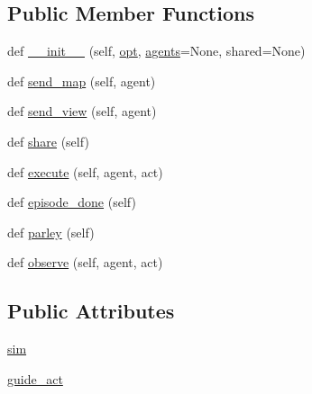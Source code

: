 \subsection*{Public Member Functions}
\begin{DoxyCompactItemize}
\item 
def \hyperlink{classparlai_1_1tasks_1_1talkthewalk_1_1worlds_1_1SimulateWorld_ab9073698c5054aaa0a605c946275cce4}{\+\_\+\+\_\+init\+\_\+\+\_\+} (self, \hyperlink{classparlai_1_1core_1_1worlds_1_1World_a3640d92718acd3e6942a28c1ab3678bd}{opt}, \hyperlink{classparlai_1_1core_1_1worlds_1_1MultiAgentDialogWorld_a05fc93525cb86edef121980fc55f9926}{agents}=None, shared=None)
\item 
def \hyperlink{classparlai_1_1tasks_1_1talkthewalk_1_1worlds_1_1SimulateWorld_aaf801dc51b7f37b6fb9629194ca4b2ee}{send\+\_\+map} (self, agent)
\item 
def \hyperlink{classparlai_1_1tasks_1_1talkthewalk_1_1worlds_1_1SimulateWorld_a6198679191b1f38d9c503372c99a8879}{send\+\_\+view} (self, agent)
\item 
def \hyperlink{classparlai_1_1tasks_1_1talkthewalk_1_1worlds_1_1SimulateWorld_ab11f69df41dbfe8552855eef15902a95}{share} (self)
\item 
def \hyperlink{classparlai_1_1tasks_1_1talkthewalk_1_1worlds_1_1SimulateWorld_ab3c47cd21114eb9b4d043f76d2a387e7}{execute} (self, agent, act)
\item 
def \hyperlink{classparlai_1_1tasks_1_1talkthewalk_1_1worlds_1_1SimulateWorld_a617e95ecc8ed3dd19c3cc391c4129b42}{episode\+\_\+done} (self)
\item 
def \hyperlink{classparlai_1_1tasks_1_1talkthewalk_1_1worlds_1_1SimulateWorld_a6bd5a8a8e194dd4aa76aeecdf429bc7f}{parley} (self)
\item 
def \hyperlink{classparlai_1_1tasks_1_1talkthewalk_1_1worlds_1_1SimulateWorld_a1049d955f85f84855bda51be0f3e9a69}{observe} (self, agent, act)
\end{DoxyCompactItemize}
\subsection*{Public Attributes}
\begin{DoxyCompactItemize}
\item 
\hyperlink{classparlai_1_1tasks_1_1talkthewalk_1_1worlds_1_1SimulateWorld_a7724bbed97d76014945accf188af43d3}{sim}
\item 
\hyperlink{classparlai_1_1tasks_1_1talkthewalk_1_1worlds_1_1SimulateWorld_ac9241967a52685e240994bccf5738255}{guide\+\_\+act}
\end{DoxyCompactItemize}
